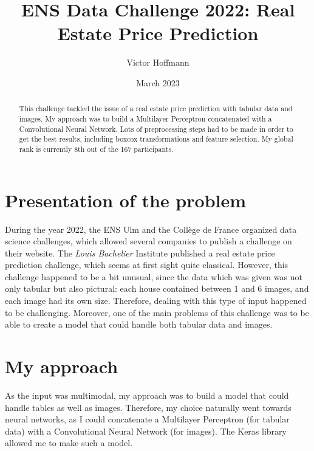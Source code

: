 \documentclass[11pt, a4paper, twocolumn]{article}
\title{ENS Data Challenge 2022: Real Estate Price Prediction}
\author{Victor Hoffmann}
\date{March 2023}
\begin{document}
\pagestyle{fancy}
\fancyhead{} %

\fancyfoot{} %
\fancyfoot[LE,RO]{\thepage}           %
\maketitle

\begin{abstract}
    This challenge tackled the issue of a real estate price prediction with tabular data and images. My approach was to build a Multilayer Perceptron concatenated with a Convolutional Neural Network. Lots of preprocessing steps had to be made in order to get the best results, including boxcox transformations and feature selection. My global rank is currently 8th out of the 167 participants. 
\end{abstract}
\section{Presentation of the problem}
During the year 2022, the ENS Ulm and the Collège de France organized data science challenges, which allowed several companies to publish a challenge on their website. The \textit{Louis Bachelier} Institute published a real estate price prediction challenge, which seems at first sight quite classical. However, this challenge happened to be a bit unusual, since the data which was given was not only tabular but also pictural: each house contained between 1 and 6 images, and each image had its own size. Therefore, dealing with this type of input happened to be challenging. Moreover, one of the main problems of this challenge was to be able to create a model that could handle both tabular data and images. 
\section{My approach}

As the input was multimodal, my approach was to build a model that could handle tables as well as images. Therefore, my choice naturally went towards neural networks, as I could concatenate a Multilayer Perceptron (for tabular data) with a Convolutional 
Neural Network (for images). The Keras library allowed me to make such a model.\\
\end{document}
